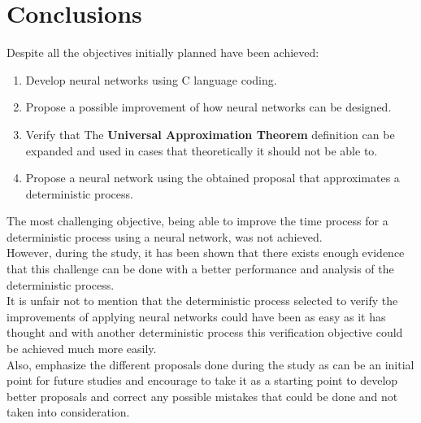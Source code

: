 \documentclass[a4paper, 11pt]{article}
\begin{document}
\section{Conclusions}
Despite all the objectives initially planned have been achieved:
\begin{enumerate}
    \item Develop neural networks using C language coding.
    \item Propose a possible improvement of how neural networks can be designed.
    \item Verify that The \textbf{Universal Approximation Theorem} definition can be expanded and used in cases that theoretically it should not be able to.
    \item Propose a neural network using the obtained proposal that approximates a deterministic process.
\end{enumerate} 
The most challenging objective, being able to improve the time process for a deterministic process using a neural network, was not achieved.\\
However, during the study, it has been shown that there exists enough evidence that this challenge can be done with a better performance and analysis of the deterministic process.\\
It is unfair not to mention that the deterministic process selected to verify the improvements of applying neural networks could have been as easy as it has thought and with another deterministic process this verification objective could be achieved much more easily.\\
Also, emphasize the different proposals done during the study as can be an initial point for future studies and encourage to take it as a starting point to develop better proposals and correct any possible mistakes that could be done and not taken into consideration.\\
\end{document}
